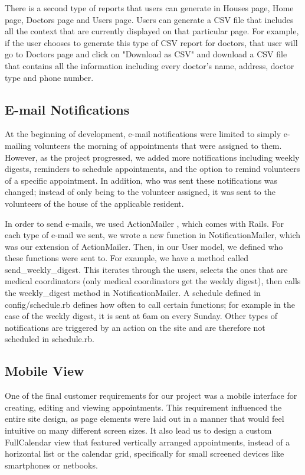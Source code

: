 \documentclass{sig-alternate}
\begin{document}
There is a second type of reports that users can generate in Houses page, Home page, Doctors page and Users page. Users can generate a CSV file that includes all the context that are currently displayed on that particular page. For example, if the user chooses to generate this type of CSV report for doctors, that user will go to Doctors page and click on "Download as CSV" and download a CSV file that contains all the information including every doctor's name, address, doctor type and phone number. 

\subsection{E-mail Notifications}
At the beginning of development, e-mail notifications were limited to simply e-mailing volunteers the morning of appointments that were assigned to them. However, as the project progressed, we added more notifications including weekly digests, reminders to schedule appointments, and the option to remind volunteers of a specific appointment. In addition, who was sent these notifications was changed; instead of only being to the volunteer assigned, it was sent to the volunteers of the house of the applicable resident.

In order to send e-mails, we used ActionMailer \cite{actionmailer}, which comes with Rails. For each type of e-mail we sent, we wrote a new function in NotificationMailer, which was our extension of ActionMailer. Then, in our User model, we defined who these functions were sent to. For example, we have a method called send\_weekly\_digest.  This iterates through the users, selects the ones that are medical coordinators (only medical coordinators get the weekly digest), then calls the weekly\_digest method in NotificationMailer. A schedule defined in config/schedule.rb defines how often to call certain functions; for example in the case of the weekly digest, it is sent at 6am on every Sunday. Other types of notifications are triggered by an action on the site and are therefore not scheduled in schedule.rb. 

\subsection{Mobile View}
One of the final customer requirements for our project was a mobile interface for creating, editing and viewing appointments. This requirement influenced the entire site design, as page elements were laid out in a manner that would feel intuitive on many different screen sizes. It also lead us to design a custom FullCalendar view that featured vertically arranged appointments, instead of a horizontal list or the calendar grid, specifically for small screened devices like smartphones or netbooks.
\end{document}
